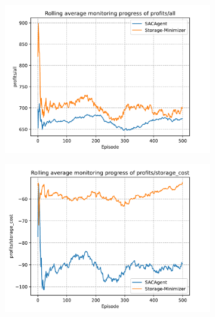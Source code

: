 \begin{figure}[t]
	\centering
	\begin{subfigure}{0.49\textwidth}
		\centering
		\includegraphics[width = \textwidth]{images/experiments/SACDuopolyOtherComp/SACOtherCompProfitsAll.pdf}\\
		\label{fig:SACDuopolyOtherCompetitors1}
	\end{subfigure}
	\begin{subfigure}{0.49\textwidth}
		\centering
		\includegraphics[width = \textwidth]{images/experiments/SACDuopolyOtherComp/SACOtherCompStorageCosts.pdf}\\
		\label{fig:SACDuopolyOtherCompetitors2}
	\end{subfigure}

\end{figure}
